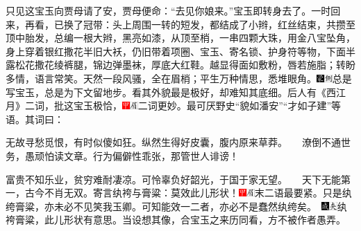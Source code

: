 {只见这宝玉向贾母请了安，贾母便命：“去见你娘来。”宝玉即转身去了。一时回来，再看，已换了冠带：头上周围一转的短发，都结成了小辫，红丝结束，共攒至顶中胎发，总编一根大辫，黑亮如漆，从顶至梢，一串四颗大珠，用金八宝坠角，身上穿着银红撒花半旧大袄，仍旧带着项圈、宝玉、寄名锁、护身符等物，下面半露松花撒花绫裤腿，锦边弹墨袜，厚底大红鞋。越显得面如敷粉，唇若施脂；转盼多情，语言常笑。天然一段风骚，全在眉梢；平生万种情思，悉堆眼角。{\includegraphics[width=3mm]{../Images/00006}\includegraphics[width=3mm]{../Images/00011}\footnotesize \kaishu 总是写宝玉，总是为下文留地步。}看其外貌最是极好，却难知其底细。后人有《西江月》二词，批这宝玉极恰，{\includegraphics[width=3mm]{../Images/00002}\includegraphics[width=3mm]{../Images/00010}\footnotesize \kaishu 二词更妙。最可厌野史“貌如潘安”“才如子建”等语。}其词曰：

无故寻愁觅恨，有时似傻如狂。纵然生得好皮囊，腹内原来草莽。　　潦倒不通世务，愚顽怕读文章。行为偏僻性乖张，那管世人诽谤！

富贵不知乐业，贫穷难耐凄凉。可怜辜负好韶光，于国于家无望。　　天下无能第一，古今不肖无双。寄言纨袴与膏粱：莫效此儿形状！{{\includegraphics[width=3mm]{../Images/00002}\includegraphics[width=3mm]{../Images/00010}\footnotesize \kaishu 末二语最要紧。只是纨绔膏粱，亦未必不见笑我玉卿。可知能效一二者，亦必不是蠢然纨绔矣。　}\includegraphics[width=3mm]{../Images/00005}\includegraphics[width=3mm]{../Images/00012}\footnotesize \kaishu 纨袴膏粱，此儿形状有意思。当设想其像，合宝玉之来历同看，方不被作者愚弄。}

}
